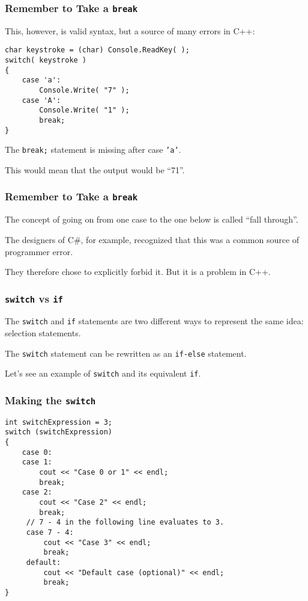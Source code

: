 \begin{frame}[fragile]
\frametitle{Remember to Take a \texttt{break}}

This, however, is valid syntax, but a source of many errors in C++:

\begin{verbatim}
char keystroke = (char) Console.ReadKey( );
switch( keystroke )
{
    case 'a':
        Console.Write( "7" );
    case 'A':
        Console.Write( "1" );
        break;
}
\end{verbatim}

The \texttt{break;} statement is missing after case \texttt{'a'}.

This would mean that the output would be ``71''.

\end{frame}

\begin{frame}[fragile]
\frametitle{Remember to Take a \texttt{break}}

The concept of going on from one case to the one below is called ``fall through''.

The designers of C\#, for example, recognized that this was a common source of programmer error.

They therefore chose to explicitly forbid it. But it is a problem in C++.

\end{frame}

\begin{frame}
\frametitle{\texttt{switch} vs \texttt{if}}
The \texttt{switch} and \texttt{if} statements are two different ways to represent the same idea: selection statements.

The \texttt{switch} statement can be rewritten as an \texttt{if-else} statement.

Let's see an example of \texttt{switch} and its equivalent \texttt{if}.


\end{frame}

\begin{frame}[fragile]
\frametitle{Making the \texttt{switch}}

{\scriptsize
\begin{verbatim}
int switchExpression = 3;
switch (switchExpression)
{
    case 0:
    case 1:
        cout << "Case 0 or 1" << endl;
        break;
    case 2:
        cout << "Case 2" << endl;
        break;
     // 7 - 4 in the following line evaluates to 3. 
     case 7 - 4:
         cout << "Case 3" << endl;
         break;   
     default:
         cout << "Default case (optional)" << endl;
         break;
}
\end{verbatim}
}

\end{frame}

